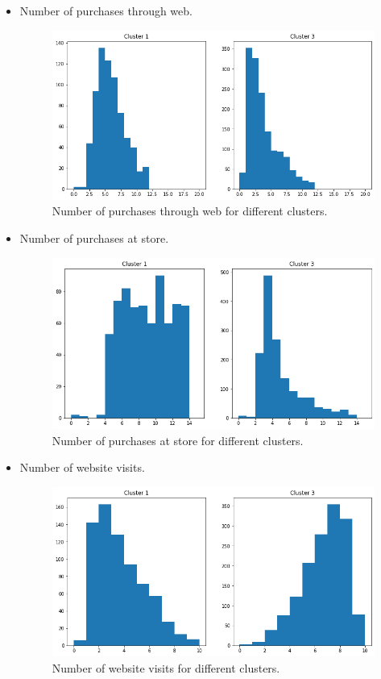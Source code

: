 \documentclass[11pt]{article}
\begin{document}
\begin{itemize}
\newpage

\item Number of purchases through web.

\begin{figure}[h!]
\centerline{\includegraphics[scale=0.35]{clu_conc_9.png}}
\caption{Number of purchases through web for different clusters.}
\end{figure}

\item Number of purchases at store.

\begin{figure}[h!]
\centerline{\includegraphics[scale=0.35]{clu_conc_10.png}}
\caption{Number of purchases at store for different clusters.}
\end{figure}

\item Number of website visits.

\begin{figure}[h!]
\centerline{\includegraphics[scale=0.35]{clu_conc_11.png}}
\caption{Number of website visits for different clusters.}
\end{figure}


\end{itemize}
\end{document}
